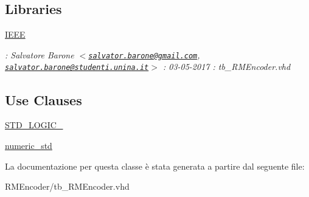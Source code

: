 \subsection*{Libraries}
 \begin{DoxyCompactItemize}
\item 
\hypertarget{classtb___r_m_encoder_ae4f03c286607f3181e16b9aa12d0c6d4}{\hyperlink{classtb___r_m_encoder_ae4f03c286607f3181e16b9aa12d0c6d4}{I\+E\+E\+E} }\label{classtb___r_m_encoder_ae4f03c286607f3181e16b9aa12d0c6d4}

\begin{DoxyCompactList}\small\item\em \+: Salvatore Barone $<$\href{mailto:salvator.barone@gmail.com}{\tt salvator.\+barone@gmail.\+com}, \href{mailto:salvator.barone@studenti.unina.it}{\tt salvator.\+barone@studenti.\+unina.\+it}$>$ \+: 03-\/05-\/2017 \+: tb\+\_\+\+R\+M\+Encoder.\+vhd \end{DoxyCompactList}\end{DoxyCompactItemize}
\subsection*{Use Clauses}
 \begin{DoxyCompactItemize}
\item 
\hypertarget{classtb___r_m_encoder_gaa4b2b25246a821511120e3149b003563}{\hyperlink{group___r_m_encoder_gaa4b2b25246a821511120e3149b003563}{S\+T\+D\+\_\+\+L\+O\+G\+I\+C\+\_}   }\label{classtb___r_m_encoder_gaa4b2b25246a821511120e3149b003563}

\item 
\hypertarget{classtb___r_m_encoder_ga2edc34402b573437d5f25fa90ba4013e}{\hyperlink{group___r_m_encoder_ga2edc34402b573437d5f25fa90ba4013e}{numeric\+\_\+std}   }\label{classtb___r_m_encoder_ga2edc34402b573437d5f25fa90ba4013e}

\end{DoxyCompactItemize}


La documentazione per questa classe è stata generata a partire dal seguente file\+:\begin{DoxyCompactItemize}
\item 
R\+M\+Encoder/tb\+\_\+\+R\+M\+Encoder.\+vhd\end{DoxyCompactItemize}
